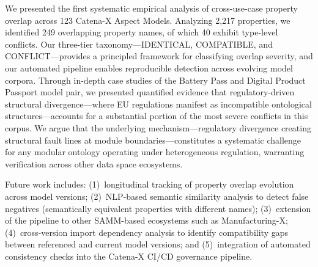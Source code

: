 \documentclass[]{ceurart}
\begin{document}
We presented the first systematic empirical analysis of cross-use-case
property overlap across 123 Catena-X Aspect Models. Analyzing 2{,}217
properties, we identified 249 overlapping property names, of which 40
exhibit type-level conflicts. Our three-tier taxonomy---IDENTICAL,
COMPATIBLE, and CONFLICT---provides a principled framework for
classifying overlap severity, and our automated pipeline enables
reproducible detection across evolving model corpora. Through in-depth
case studies of the Battery Pass and Digital Product Passport model pair,
we presented quantified evidence that regulatory-driven structural
divergence---where EU regulations manifest as incompatible ontological
structures---accounts for a substantial portion of the most severe
conflicts in this corpus. We argue that the underlying
mechanism---regulatory divergence creating structural fault lines at
module boundaries---constitutes a systematic challenge for any modular
ontology operating under heterogeneous regulation, warranting
verification across other data space ecosystems.

Future work includes: (1)~longitudinal tracking of property overlap
evolution across model versions; (2)~NLP-based semantic similarity
analysis to detect false negatives (semantically equivalent properties
with different names); (3)~extension of the pipeline to other
SAMM-based ecosystems such as Manufacturing-X; (4)~cross-version
import dependency analysis to identify compatibility gaps between
referenced and current model versions; and (5)~integration
of automated consistency checks into the Catena-X CI/CD governance
pipeline.

\begin{acknowledgments}
\end{acknowledgments}


\end{document}
